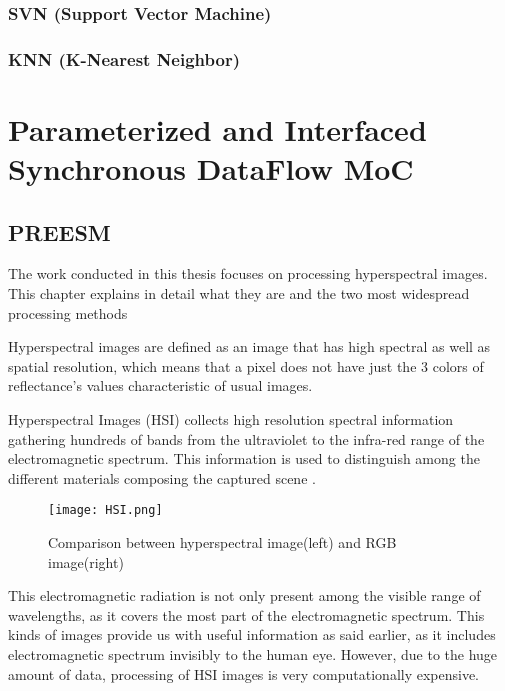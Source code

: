                \subsubsection{SVN (Support Vector Machine)}
                 \subsubsection{KNN (K-Nearest Neighbor)}
         \section{Parameterized and Interfaced Synchronous DataFlow MoC} 
             \subsection{PREESM} 
          	
	The work conducted in this thesis focuses on processing hyperspectral images. This chapter explains in detail what they are and the two most widespread processing methods   
	  
   Hyperspectral images are defined as an image that has high spectral as well as spatial  resolution, which means that a pixel does not have just the 3 colors of reflectance's values characteristic of usual images.
   
   Hyperspectral Images (HSI) collects high resolution spectral information gathering hundreds of bands from the ultraviolet to the infra-red range of the electromagnetic spectrum. This information is used to distinguish among the different materials composing the captured scene \cite{lee1987synchronous}.
   
     \begin{figure}[H]
        \texttt{[image: HSI.png]}        
        \centering    
        \caption{Comparison between hyperspectral image(left) and RGB image(right)}
        \label{fig:systemArch}
    \end{figure}
       
  
    
  This electromagnetic radiation is not only present among the visible range of wavelengths, as it covers the most part of the electromagnetic spectrum. This kinds of images provide us with useful information as said earlier, as it includes electromagnetic spectrum invisibly to the human eye. However, due to the huge amount of data, processing of HSI images is very computationally expensive.
